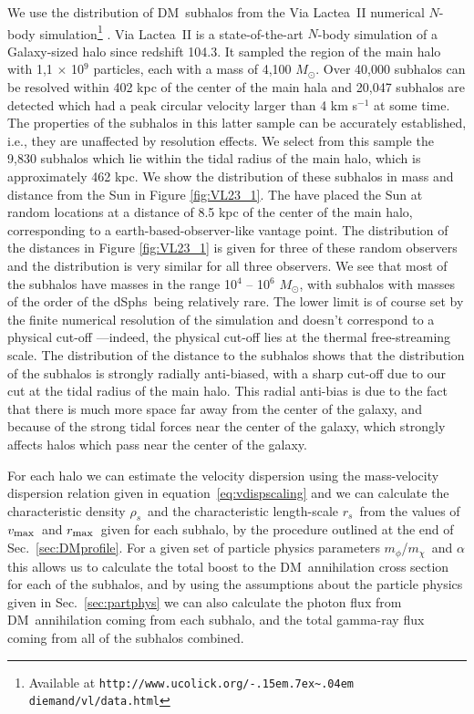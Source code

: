 \documentclass[aps,prd,twocolumn,amsmath,amssymb,floatfix,nofootinbib,10pt]{revtex4}
\newcommand{\ie}{i.e.}
\newcommand{\VL}{Via Lactea}
\newcommand{\DM}{DM}
\newcommand{\mdm}{\ensuremath{m_{\chi}}}
\newcommand{\mv}{\ensuremath{m_{\phi}}}
\newcommand{\eqnname}{equation}
\newcommand{\rhos}{\ensuremath{\rho_s}}
\newcommand{\rs}{\ensuremath{r_s}}
\newcommand{\Msol}{\ensuremath{M_{\odot}}}
\newcommand{\Msun}{\Msol}
\newcommand{\vmax}{\ensuremath{v_{\mbox{{\footnotesize max}}}}}
\newcommand{\rmax}{\ensuremath{r_{\mbox{{\footnotesize max}}}}}
\newcommand{\dSphs}{dSphs}
\def\urltilda{\kern -.15em\lower .7ex\hbox{\~{}}\kern .04em}
\begin{document}
We use the distribution of \DM\ subhalos from the \VL\ II numerical
$N$-body simulation\footnote{Available at
\texttt{http://www.ucolick.org/\urltilda$\!$diemand/vl/data.html}}
\cite{2008Natur.454..735D}. \VL\ II is a state-of-the-art $N$-body
simulation of a Galaxy-sized halo since redshift 104.3. It sampled the
region of the main halo with 1,1 $\times$ 10$^9$ particles, each with
a mass of 4,100 \Msun. Over 40,000 subhalos can be resolved within 402
kpc of the center of the main hala and 20,047 subhalos are detected
which had a peak circular velocity larger than 4 km s$^{-1}$ at some
time. The properties of the subhalos in this latter sample can be
accurately established, \ie, they are unaffected by resolution
effects. We select from this sample the 9,830 subhalos which lie
within the tidal radius of the main halo, which is approximately 462
kpc. We show the distribution of these subhalos in mass and distance
from the Sun in Figure \ref{fig:VL23_1}. The have placed the Sun at
random locations at a distance of 8.5 kpc of the center of the main
halo, corresponding to a earth-based-observer-like vantage point. The
distribution of the distances in Figure \ref{fig:VL23_1} is given for
three of these random observers and the distribution is very similar
for all three observers. We see that most of the subhalos have masses
in the range 10$^4$ -- 10$^6$ \Msun, with subhalos with masses of the
order of the \dSphs\ being relatively rare. The lower limit is of
course set by the finite numerical resolution of the simulation and
doesn't correspond to a physical cut-off ---indeed, the physical
cut-off lies at the thermal free-streaming scale. The distribution of
the distance to the subhalos shows that the distribution of the
subhalos is strongly radially anti-biased, with a sharp cut-off due to
our cut at the tidal radius of the main halo. This radial anti-bias is
due to the fact that there is much more space far away from the center
of the galaxy, and because of the strong tidal forces near the center
of the galaxy, which strongly affects halos which pass near the center
of the galaxy.

For each halo we can estimate the velocity dispersion using the
mass-velocity dispersion relation given in \eqnname\
\ref{eq:vdispscaling} and we can calculate the characteristic density
\rhos\ and the characteristic length-scale \rs\ from the values of
\vmax\ and \rmax\ given for each subhalo, by the procedure outlined at
the end of Sec.~\ref{sec:DMprofile}. For a given set of particle
physics parameters \mv/\mdm\ and $\alpha$ this allows us to calculate
the total boost to the \DM\ annihilation cross section for each of the
subhalos, and by using the assumptions about the particle physics
given in Sec.~\ref{sec:partphys} we can also calculate the photon flux
from \DM\ annihilation coming from each subhalo, and the total
gamma-ray flux coming from all of the subhalos combined.
\end{document}
